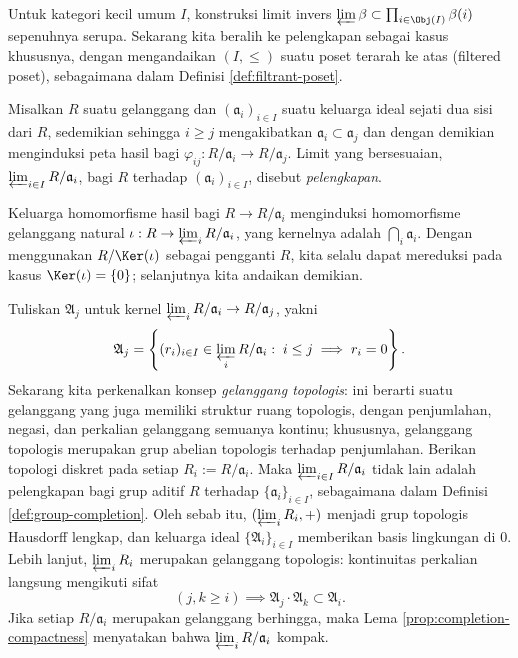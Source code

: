 Untuk kategori kecil umum $I$, konstruksi limit invers $\varprojlim \beta \subset \prod_{i \in \Obj(I)} \beta(i)$ sepenuhnya serupa. Sekarang kita beralih ke pelengkapan sebagai kasus khususnya, dengan mengandaikan $(I, \leq)$ suatu poset terarah ke atas (filtered poset), sebagaimana dalam Definisi \ref{def:filtrant-poset}.

\begin{definition}\label{def:ring-completion}
	Misalkan $R$ suatu gelanggang dan $(\mathfrak{a}_i)_{i \in I}$ suatu keluarga ideal sejati dua sisi dari $R$, sedemikian sehingga $i \geq j$ mengakibatkan $\mathfrak{a}_i \subset \mathfrak{a}_j$ dan dengan demikian menginduksi peta hasil bagi $\varphi_{ij}: R/\mathfrak{a}_i \to R/\mathfrak{a}_j$. Limit yang bersesuaian, $\varprojlim_{i \in I} R/\mathfrak{a}_i$, bagi $R$ terhadap $(\mathfrak{a}_i)_{i \in I}$, disebut \emph{pelengkapan}.
\end{definition}
Keluarga homomorfisme hasil bagi $R \to R/\mathfrak{a}_i$ menginduksi homomorfisme gelanggang natural $\iota: R \to \varprojlim_i R/\mathfrak{a}_i$, yang kernelnya adalah $\bigcap_i \mathfrak{a}_i$. Dengan menggunakan $R/\Ker(\iota)$ sebagai pengganti $R$, kita selalu dapat mereduksi pada kasus $\Ker(\iota)=\{0\}$; selanjutnya kita andaikan demikian.

Tuliskan $\mathfrak{A}_j$ untuk kernel $\varprojlim_i R/\mathfrak{a}_i \to R/\mathfrak{a}_j$, yakni
\[ \mathfrak{A}_j = \left\{ (r_i)_{i \in I} \in \varprojlim_i R/\mathfrak{a}_i : \; i \leq j \implies r_i=0 \right\}. \]
Sekarang kita perkenalkan konsep \emph{gelanggang topologis}:  ini berarti suatu gelanggang yang juga memiliki struktur ruang topologis, dengan penjumlahan, negasi, dan perkalian gelanggang semuanya kontinu; khususnya, gelanggang topologis merupakan grup abelian topologis terhadap penjumlahan. Berikan topologi diskret pada setiap $R_i := R/\mathfrak{a}_i$. Maka $\varprojlim_{i \in I} R/\mathfrak{a}_i$ tidak lain adalah pelengkapan bagi grup aditif $R$ terhadap $\{\mathfrak{a}_i\}_{i \in I}$, sebagaimana dalam Definisi \ref{def:group-completion}. Oleh sebab itu, $(\varprojlim_i R_i, +)$ menjadi grup topologis Hausdorff lengkap, dan keluarga ideal $\{\mathfrak{A}_i\}_{i \in I}$ memberikan basis lingkungan di $0$. Lebih lanjut, $\varprojlim_i R_i$ merupakan gelanggang topologis: kontinuitas perkalian langsung mengikuti sifat
\[ (j,k \geq i) \implies \mathfrak{A}_j \cdot \mathfrak{A}_k \subset \mathfrak{A}_i. \]
Jika setiap $R/\mathfrak{a}_i$ merupakan gelanggang berhingga, maka Lema \ref{prop:completion-compactness} menyatakan bahwa $\varprojlim_i R/\mathfrak{a}_i$ kompak.

